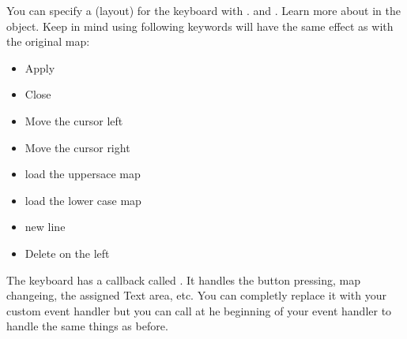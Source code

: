 \documentclass[letterpaper,10pt,english]{sphinxmanual}
\begin{document}
You can specify a  (layout) for the keyboard with . and .
Learn more about in the {\hyperref[\detokenize{object-types/btnm::doc}]{}} object.
Keep in mind using following keywords will have the same effect as with the original map:
\begin{itemize}
\item {} 
 Apply

\item {} 
 Close

\item {} 
 Move the cursor left

\item {} 
 Move the cursor right

\item {} 
 load the uppersace map

\item {} 
 load the lower case map

\item {} 
 new line

\item {} 
 Delete on the left

\end{itemize}

The keyboard has a  callback called .
It handles the button pressing, map changeing, the assigned Text area, etc.
You can completly replace it with your custom event handler but you can call  at he beginning of your event handler to handle the same things as before.
\end{document}
